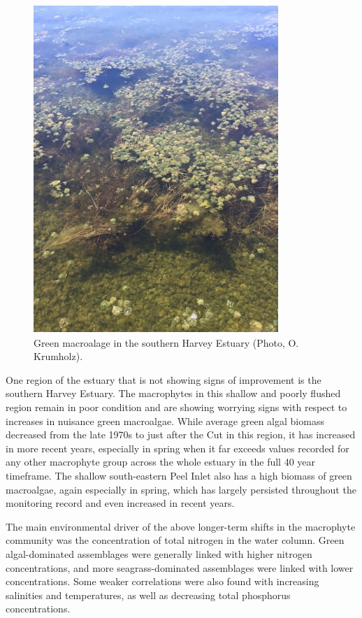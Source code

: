 \documentclass[
]{book}
\begin{document}
\begin{figure}
\includegraphics[width=0.5\linewidth]{images/macrophytes/picture2} \caption{Green macroalage in the southern Harvey Estuary (Photo, O. Krumholz).}\label{fig:macrophytes-pic2}
\end{figure}

One region of the estuary that is not showing signs of improvement is the southern Harvey Estuary. The macrophytes in this shallow and poorly flushed region remain in poor condition and are showing worrying signs with respect to increases in nuisance green macroalgae. While average green algal biomass decreased from the late 1970s to just after the Cut in this region, it has increased in more recent years, especially in spring when it far exceeds values recorded for any other macrophyte group across the whole estuary in the full 40 year timeframe. The shallow south-eastern Peel Inlet also has a high biomass of green macroalgae, again especially in spring, which has largely persisted throughout the monitoring record and even increased in recent years.

The main environmental driver of the above longer-term shifts in the macrophyte community was the concentration of total nitrogen in the water column. Green algal-dominated assemblages were generally linked with higher nitrogen concentrations, and more seagrass-dominated assemblages were linked with lower concentrations. Some weaker correlations were also found with increasing salinities and temperatures, as well as decreasing total phosphorus concentrations.
\end{document}
